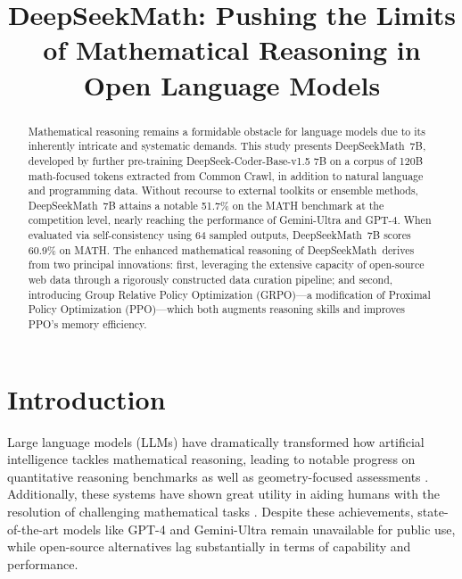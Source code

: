 \title{DeepSeekMath: Pushing the Limits of Mathematical Reasoning in Open Language Models}

\begin{abstract}
Mathematical reasoning remains a formidable obstacle for language models due to its inherently intricate and systematic demands. This study presents DeepSeekMath~7B, developed by further pre-training DeepSeek-Coder-Base-v1.5 7B on a corpus of 120B math-focused tokens extracted from Common Crawl, in addition to natural language and programming data. Without recourse to external toolkits or ensemble methods, DeepSeekMath~7B attains a notable 51.7\% on the MATH benchmark at the competition level, nearly reaching the performance of Gemini-Ultra and GPT-4. When evaluated via self-consistency using 64 sampled outputs, DeepSeekMath~7B scores 60.9\% on MATH. The enhanced mathematical reasoning of DeepSeekMath~derives from two principal innovations: first, leveraging the extensive capacity of open-source web data through a rigorously constructed data curation pipeline; and second, introducing Group Relative Policy Optimization (GRPO)—a modification of Proximal Policy Optimization (PPO)—which both augments reasoning skills and improves PPO’s memory efficiency.
\end{abstract}

\section{Introduction}

Large language models (LLMs) have dramatically transformed how artificial intelligence tackles mathematical reasoning, leading to notable progress on quantitative reasoning benchmarks \citep{MATH} as well as geometry-focused assessments \citep{trinh2024solving}. Additionally, these systems have shown great utility in aiding humans with the resolution of challenging mathematical tasks \citep{tao}. Despite these achievements, state-of-the-art models like GPT-4 \citep{gpt4} and Gemini-Ultra \citep{gemini} remain unavailable for public use, while open-source alternatives lag substantially in terms of capability and performance.

